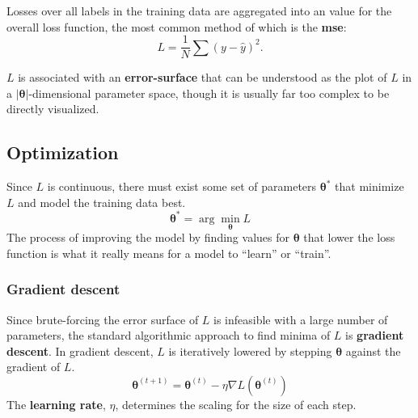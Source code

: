 \documentclass[12pt]{report}
\theoremstyle{definition}
\theoremstyle{remark}
\begin{document}
Losses over all labels in the training data are aggregated into an value for the overall loss function, the most common method of which is the \textbf{\gls{mse}}:
\begin{equation}
    L = \frac{1}{N}\sum (y - \hat{y})^2 .
\end{equation}

$L$ is associated with an \textbf{\gls{error-surface}} that can be understood as the plot of $L$ in a $|\boldsymbol{\theta}|$-dimensional parameter space, though it is usually far too complex to be directly visualized.

\subsection{Optimization}

Since $L$ is continuous, there must exist some set of parameters $\boldsymbol{\theta}^\ast$ that minimize $L$ and model the training data best.
\begin{equation}
    \boldsymbol{\theta}^\ast = \arg\min_{\boldsymbol{\theta}} L
\end{equation}
The process of improving the model by finding values for $\boldsymbol{\theta}$ that lower the loss function is what it really means for a model to ``learn'' or ``train''.

\subsubsection{Gradient descent}

Since brute-forcing the error surface of $L$ is infeasible with a large number of parameters, the standard algorithmic approach to find minima of $L$ is \textbf{gradient descent}. In gradient descent, $L$ is iteratively lowered by stepping $\boldsymbol{\theta}$ against the gradient of $L$.
\begin{equation}
    \boldsymbol{\theta}^{(t+1)} = \boldsymbol{\theta}^{(t)}-\eta\nabla L(\boldsymbol{\theta}^{(t)})
\end{equation}
The \textbf{learning rate}, $\eta$, determines the scaling for the size of each step.
\end{document}
